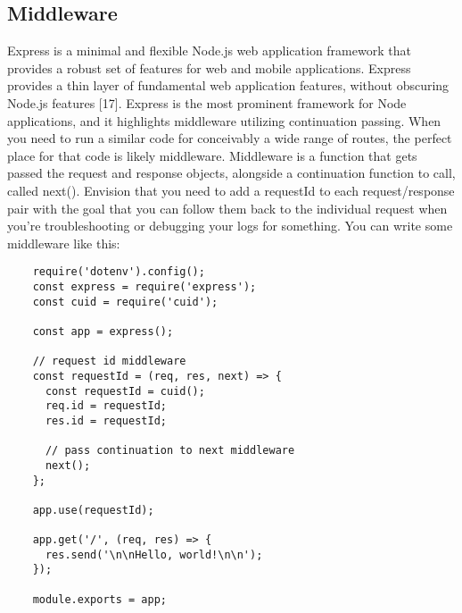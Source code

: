 \documentclass[../thesis.tex]{subfiles}
\begin{document}
\subsection*{Middleware}
Express is a minimal and flexible Node.js web application framework that provides a robust set of features for web and mobile applications.  Express provides a thin layer of fundamental web application features, without obscuring Node.js features [17].
\vspace{5mm}
Express is the most prominent framework for Node applications, and it highlights middleware utilizing continuation passing. When you need to run a similar code for conceivably a wide range of routes, the perfect place for that code is likely middleware. 
Middleware is a function that gets passed the request and response objects, alongside a continuation function to call, called next(). Envision that you need to add a requestId to each request/response pair with the goal that you can follow them back to the individual request when you're troubleshooting or debugging your logs for something.
\vspace{5mm}
You can write some middleware like this:
\begin{lstlisting}
    require('dotenv').config();
    const express = require('express');
    const cuid = require('cuid');
    
    const app = express();
    
    // request id middleware
    const requestId = (req, res, next) => {
      const requestId = cuid();
      req.id = requestId;
      res.id = requestId;
    
      // pass continuation to next middleware
      next();
    };
    
    app.use(requestId);
    
    app.get('/', (req, res) => {
      res.send('\n\nHello, world!\n\n');
    });
    
    module.exports = app;
    
\end{lstlisting}
\newpage
\end{document}
